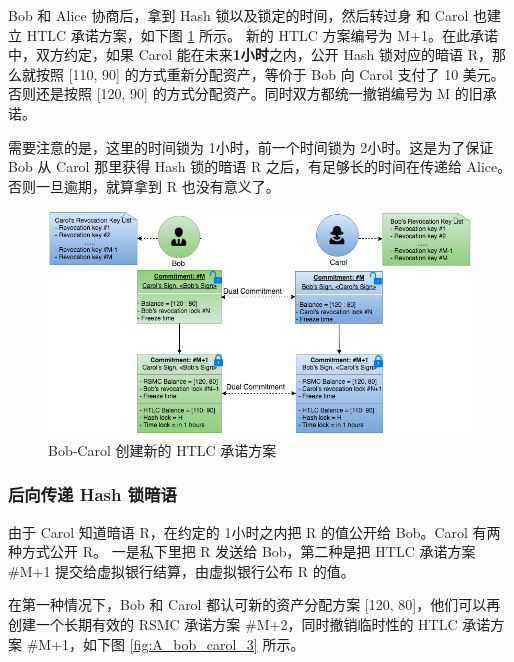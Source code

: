 \begin{appendices}
Bob 和 Alice 协商后，拿到 Hash 锁以及锁定的时间，然后转过身 和 Carol 也建立 HTLC 承诺方案，如下图 \ref{fig:A_bob_carol_2} 所示。
新的 HTLC 方案编号为 M+1。在此承诺中，双方约定，如果 Carol 能在未来\textbf{1小时}之内，公开 Hash 锁对应的暗语 R，那么就按照 [110, 90] 的方式重新分配资产，等价于 Bob 向 Carol 支付了 10 美元。
否则还是按照 [120, 90] 的方式分配资产。同时双方都统一撤销编号为 M 的旧承诺。

需要注意的是，这里的时间锁为 1小时，前一个时间锁为 2小时。这是为了保证 Bob 从 Carol 那里获得 Hash 锁的暗语 R 之后，有足够长的时间在传递给 Alice。否则一旦逾期，就算拿到 R 也没有意义了。

\begin{figure}[h!]
    \centering
    \includegraphics[width=12cm, keepaspectratio]{../images/bob_carol_2.png}
    \caption{Bob-Carol 创建新的 HTLC 承诺方案}
    \label{fig:A_bob_carol_2}
\end{figure}

\subsubsection{后向传递 Hash 锁暗语}
由于 Carol 知道暗语 R，在约定的 1小时之内把 R 的值公开给 Bob。Carol 有两种方式公开 R。
一是私下里把 R 发送给 Bob，第二种是把 HTLC 承诺方案 \#M+1 提交给虚拟银行结算，由虚拟银行公布 R 的值。

在第一种情况下，Bob 和 Carol 都认可新的资产分配方案 [120, 80]，他们可以再创建一个长期有效的 RSMC 承诺方案 \#M+2，同时撤销临时性的 HTLC 承诺方案 \#M+1，如下图 \ref{fig:A_bob_carol_3} 所示。


\end{appendices}
